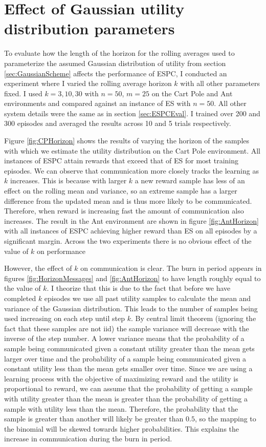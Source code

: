 \section{Effect of Gaussian utility distribution parameters}

To evaluate how the length of the horizon for the rolling averages used to parameterize the assumed Gaussian distribution of utility from section \ref{sec:GaussianScheme} affects the performance of ESPC, I conducted an experiment where I varied the rolling average horizon $k$ with all other parameters fixed. I used $k=3,10,30$ with $n=50$, $m=25$ on the Cart Pole and Ant environments and compared against an instance of ES with $n=50$. All other system details were the same as in section \ref{sec:ESPCEval}. I trained over 200 and 300 episodes and averaged the results across 10 and 5 trials respectively.

Figure \ref{fig:CPHorizon} shows the results of varying the horizon of the samples with which we estimate the utility distribution on the Cart Pole environment. All instances of ESPC attain rewards that exceed that of ES for most training episodes. We can observe that communication more closely tracks the learning as $k$ increases. This is because with larger $k$ a new reward sample has less of an effect on the rolling mean and variance, so an extreme sample has a larger difference from the updated mean and is thus more likely to be communicated. Therefore, when reward is increasing fast the amount of communication also increases.
The result in the Ant environment are shown in figure \ref{fig:AntHorizon} with all instances of ESPC achieving higher reward than ES on all episodes by a significant margin. Across the two experiments there is no obvious effect of the value of $k$ on performance

However, the effect of $k$ on communication is clear. The burn in period appears in figures \ref{fig:HorizonMessages} and \ref{fig:AntHorizon} to have length roughly equal to the value of $k$. I theorize that this is due to the fact that before we have completed $k$ episodes we use all past utility samples to calculate the mean and variance of the Gaussian distribution. This leads to the number of samples being used increasing on each step until step $k$. By central limit theorem (ignoring the fact that these samples are not iid) the sample variance will decrease with the inverse of the step number. A lower variance means that the probability of a sample being communicated given a constant utility greater than the mean gets larger over time and the probability of a sample being communicated given a constant utility less than the mean gets smaller over time. Since we are using a learning process with the objective of maximizing reward and the utility is proportional to reward, we can assume that the probability of getting a sample with utility greater than the mean is greater than the probability of getting a sample with utility less than the mean. Therefore, the probability that the sample is greater than another will likely be greater than $0.5$, so the mapping to the binomial will be skewed towards higher probabilities. This explains the increase in communication during the burn in period.

